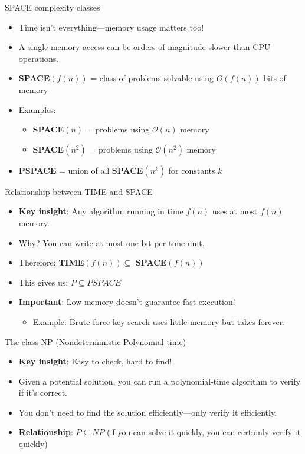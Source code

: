 \documentclass[aspectratio=169, lualatex, handout]{beamer}
\begin{document}
\begin{frame}{SPACE complexity classes}
	\begin{itemize}[<+->]
		\item Time isn't everything—memory usage matters too!
		\item A single memory access can be orders of magnitude slower than CPU operations.
		\item \textbf{SPACE}$(f(n))$ = class of problems solvable using $O(f(n))$ bits of memory
		\item Examples:
		      \begin{itemize}
			      \item \textbf{SPACE}$(n)$ = problems using $\mathcal{O}(n)$ memory
			      \item \textbf{SPACE}$(n^2)$ = problems using $\mathcal{O}(n^2)$ memory
		      \end{itemize}
		\item \textbf{PSPACE} = union of all \textbf{SPACE}$(n^k)$ for constants $k$
	\end{itemize}
\end{frame}

\begin{frame}{Relationship between TIME and SPACE}
	\begin{itemize}[<+->]
		\item \textbf{Key insight}: Any algorithm running in time $f(n)$ uses at most $f(n)$ memory.
		\item Why? You can write at most one bit per time unit.
		\item Therefore: \textbf{TIME}$(f(n)) \subseteq$ \textbf{SPACE}$(f(n))$
		\item This gives us: $P \subseteq PSPACE$
		\item \textbf{Important}: Low memory doesn't guarantee fast execution!
		      \begin{itemize}
			      \item Example: Brute-force key search uses little memory but takes forever.
		      \end{itemize}
	\end{itemize}
\end{frame}

\begin{frame}{The class NP (Nondeterministic Polynomial time)}
	\begin{itemize}[<+->]
		\item \textbf{Key insight}: Easy to check, hard to find!
		\item Given a potential solution, you can run a polynomial-time algorithm to verify if it's correct.
		\item You don't need to find the solution efficiently—only verify it efficiently.
		\item \textbf{Relationship}: $P \subseteq NP$ (if you can solve it quickly, you can certainly verify it quickly)
	\end{itemize}
\end{frame}
\end{document}
